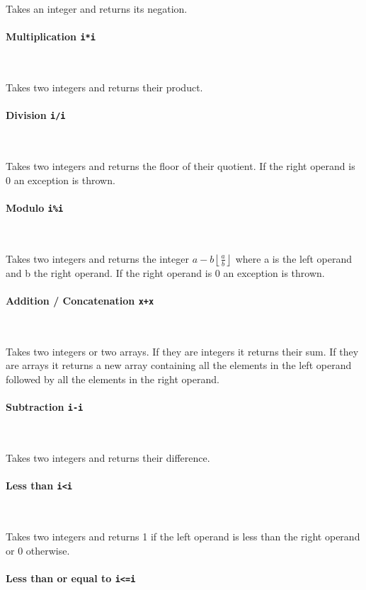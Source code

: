 \documentclass[12pt, a4paper]{article}
\begin{document}
Takes an integer and returns its negation.

\paragraph{Multiplication \quad \texttt{i*i}} \

Takes two integers and returns their product.

\paragraph{Division \quad \texttt{i/i}} \

Takes two integers and returns the floor of their quotient. If the right operand is 0 an exception is thrown.

\paragraph{Modulo \quad \texttt{i\%i}} \

Takes two integers and returns the integer $ a - b \left\lfloor \frac{a}{b} \right\rfloor $ where a is the left operand and b the right operand. If the right operand is 0 an exception is thrown.

\paragraph{Addition / Concatenation \quad \texttt{x+x}} \

Takes two integers or two arrays. If they are integers it returns their sum. If they are arrays it returns a new array containing all the elements in the left operand followed by all the elements in the right operand.

\paragraph{Subtraction \quad \texttt{i-i}} \

Takes two integers and returns their difference.

\paragraph{Less than \quad \texttt{i<i}} \

Takes two integers and returns 1 if the left operand is less than the right operand or 0 otherwise.

\paragraph{Less than or equal to \quad \texttt{i<=i}} \
\end{document}
